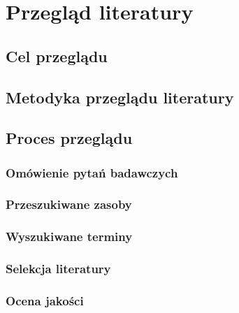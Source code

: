 \chapter{Przegląd literatury}\label{chapter:przeglad_literatury}

\section{Cel przeglądu}\label{chapter:cel_przegladu}


\section{Metodyka przeglądu literatury}\label{chapter:metodyka_przegladu}


\section{Proces przeglądu}\label{chapter:proces_przegladu}

\subsection{Omówienie pytań badawczych}\label{chapter:omowanie_pytan_badawczych}

\subsection{Przeszukiwane zasoby}\label{chapter:przeszukiwane_zasoby}

\subsection{Wyszukiwane terminy}\label{chapter:wyszukiwane_terminy}

\subsection{Selekcja literatury}\label{chapter:selekcja_literatury}

\subsection{Ocena jakości}\label{chapter:ocena_jakosci}


